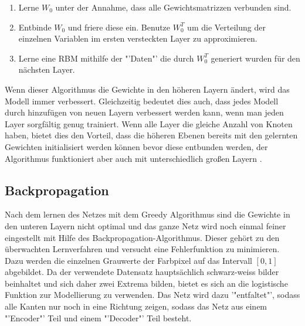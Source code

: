 \documentclass[12pt]{article}
\begin{document}
\begin{enumerate}
\item Lerne $W_0$ unter der Annahme, dass alle Gewichtsmatrizzen verbunden sind.
\item Entbinde $W_0$ und friere diese ein. Benutze $W_0^T$ um die Verteilung der einzelnen Variablen im ersten versteckten Layer zu approximieren.
\item Lerne eine RBM mithilfe der "'Daten"' die durch $W_0^T$ generiert wurden für den nächsten Layer.
\end{enumerate}

Wenn dieser Algorithmus die Gewichte in den höheren Layern ändert, wird das Modell immer verbessert. Gleichzeitig bedeutet dies auch, dass jedes Modell durch hinzufügen von neuen Layern verbessert werden kann, wenn man jeden Layer sorgfältig genug trainiert. Wenn alle Layer die gleiche Anzahl von Knoten haben, bietet dies den Vorteil, dass die höheren Ebenen bereits mit den gelernten Gewichten initialisiert werden können bevor diese entbunden werden, der Algorithmus funktioniert aber auch mit unterschiedlich großen Layern \cite{learning}.

\subsection{Backpropagation}
Nach dem lernen des Netzes mit dem Greedy Algorithmus sind die Gewichte in den unteren Layern nicht optimal und das ganze Netz wird noch einmal feiner eingestellt mit Hilfe des Backpropagation-Algorithmus. Dieser gehört zu den überwachten Lernverfahren und versucht eine Fehlerfunktion zu minimieren. Dazu werden die einzelnen Grauwerte der Farbpixel auf das Intervall $[0,1]$ abgebildet. Da der verwendete Datensatz hauptsächlich schwarz-weiss bilder beinhaltet und sich daher zwei Extrema bilden, bietet es sich an die logistische Funktion zur Modellierung zu verwenden. Das Netz wird dazu '"entfaltet"', sodass alle Kanten nur noch in eine Richtung zeigen, sodass das Netz aus einem "'Encoder"' Teil und einem "'Decoder"' Teil besteht.\cite{backprop}
\end{document}
